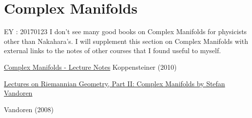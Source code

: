 \part{Complex Manifolds}


EY : 20170123 I don't see many good books on Complex Manifolds for physicists other than Nakahara's.  I will supplement this section on Complex Manifolds with external links to the notes of other courses that I found useful to myself.


\href{http://www.caramdir.at/uploads/math/piii-cm/complex-manifolds.pdf}{Complex Manifolds - Lecture Notes}
Koppensteiner (2010) \cite{dgdt:Kopp2010}


\href{http://www.staff.science.uu.nl/~vando101/MRIlectures.pdf}{Lectures on Riemannian Geometry, Part II: Complex Manifolds by Stefan Vandoren}

Vandoren (2008) \cite{dgdt:Vand2008}

